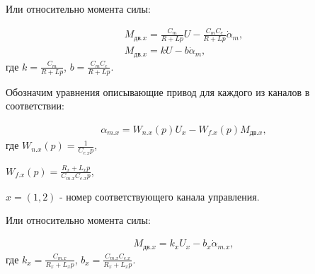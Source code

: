 Или относительно момента силы:

\begin{equation}
\label{eq:p3:lin2+}
\begin{multlined}
M_{\textit{дв.x}} = \frac{C_m}{R + L p} U - \frac{C_m C_e}{R + L p} \dot\alpha_m,\\
M_{\textit{дв.x}} = k U - b \dot\alpha_m,
\end{multlined}
\end{equation}
где
$k = \frac{C_m}{R + L p}$,
$b = \frac{C_m C_e}{R + L p}$.

Обозначим уравнения описывающие привод для каждого из каналов в соответствии:

\begin{equation}
\label{eq:p3:lin3}
\begin{multlined}
\alpha_{m.x} = W_{n.x}(p) U_x - W_{f.x}(p) M_{\textit{дв.x}},
\end{multlined}
\end{equation}
где 
$W_{n.x}(p) = \frac{1}{C_{e.x} p}$,

$W_{f.x}(p) = \frac{R_x + L_x p}{C_{m.x} C_{e.x} p}$,

$x = (1,2)$ - номер соответствующего канала управления.

Или относительно момента силы:

\begin{equation}
\label{eq:p3:lin4}
\begin{multlined}
M_{\textit{дв.x}} = k_x U_x - b_x \dot\alpha_{m.x},
\end{multlined}
\end{equation}
где
$k_x = \frac{C_{m.x}}{R_x + L_x p}$,
$b_x = \frac{C_{m.x} C_{e.x}}{R_x + L_x p}$.

